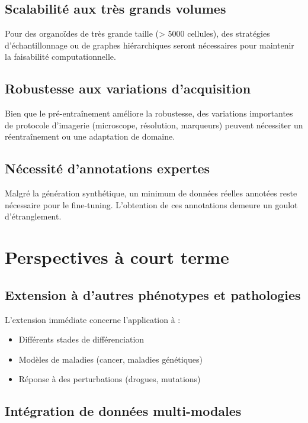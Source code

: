 \subsection{Scalabilité aux très grands volumes}

Pour des organoïdes de très grande taille (> 5000 cellules), des stratégies d'échantillonnage ou de graphes hiérarchiques seront nécessaires pour maintenir la faisabilité computationnelle.

\subsection{Robustesse aux variations d'acquisition}

Bien que le pré-entraînement améliore la robustesse, des variations importantes de protocole d'imagerie (microscope, résolution, marqueurs) peuvent nécessiter un réentraînement ou une adaptation de domaine.

\subsection{Nécessité d'annotations expertes}

Malgré la génération synthétique, un minimum de données réelles annotées reste nécessaire pour le fine-tuning. L'obtention de ces annotations demeure un goulot d'étranglement.

\section{Perspectives à court terme}

\subsection{Extension à d'autres phénotypes et pathologies}

L'extension immédiate concerne l'application à :
\begin{itemize}
    \item Différents stades de différenciation
    \item Modèles de maladies (cancer, maladies génétiques)
    \item Réponse à des perturbations (drogues, mutations)
\end{itemize}

\subsection{Intégration de données multi-modales}

